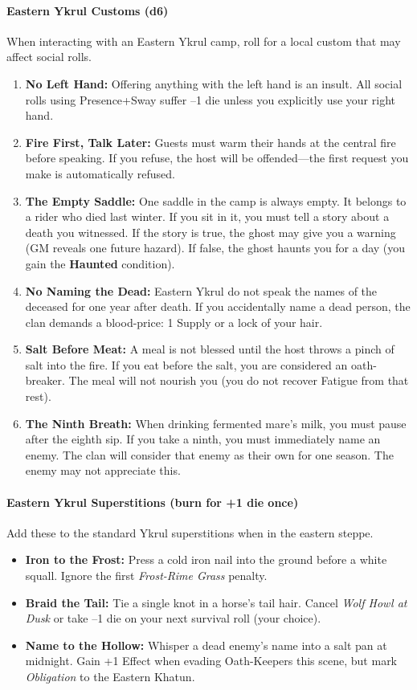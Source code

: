 \paragraph{Eastern Ykrul Customs (d6)}
When interacting with an Eastern Ykrul camp, roll for a local custom that may affect social rolls.
\begin{enumerate}
  \item \textbf{No Left Hand:} Offering anything with the left hand is an insult. All social rolls using Presence+Sway suffer --1 die unless you explicitly use your right hand.
  \item \textbf{Fire First, Talk Later:} Guests must warm their hands at the central fire before speaking. If you refuse, the host will be offended---the first request you make is automatically refused.
  \item \textbf{The Empty Saddle:} One saddle in the camp is always empty. It belongs to a rider who died last winter. If you sit in it, you must tell a story about a death you witnessed. If the story is true, the ghost may give you a warning (GM reveals one future hazard). If false, the ghost haunts you for a day (you gain the \textbf{Haunted} condition).
  \item \textbf{No Naming the Dead:} Eastern Ykrul do not speak the names of the deceased for one year after death. If you accidentally name a dead person, the clan demands a blood-price: 1 Supply or a lock of your hair.
  \item \textbf{Salt Before Meat:} A meal is not blessed until the host throws a pinch of salt into the fire. If you eat before the salt, you are considered an oath-breaker. The meal will not nourish you (you do not recover Fatigue from that rest).
  \item \textbf{The Ninth Breath:} When drinking fermented mare's milk, you must pause after the eighth sip. If you take a ninth, you must immediately name an enemy. The clan will consider that enemy as their own for one season. The enemy may not appreciate this.
\end{enumerate}

\paragraph{Eastern Ykrul Superstitions (burn for +1 die once)}
Add these to the standard Ykrul superstitions when in the eastern steppe.
\begin{itemize}[nosep]
  \item \textbf{Iron to the Frost:} Press a cold iron nail into the ground before a white squall. Ignore the first \emph{Frost-Rime Grass} penalty.
  \item \textbf{Braid the Tail:} Tie a single knot in a horse's tail hair. Cancel \emph{Wolf Howl at Dusk} or take --1 die on your next survival roll (your choice).
  \item \textbf{Name to the Hollow:} Whisper a dead enemy's name into a salt pan at midnight. Gain +1 Effect when evading Oath-Keepers this scene, but mark \emph{Obligation} to the Eastern Khatun.
\end{itemize}

